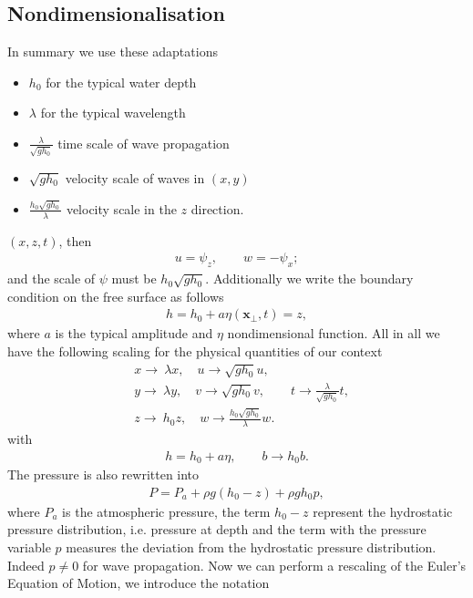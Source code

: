 \subsection{Nondimensionalisation}
In summary we use these adaptations
\begin{itemize}
    \item $h_0$ for the typical water depth
    \item $\lambda$ for the typical wavelength
    \item $\frac{\lambda}{\sqrt{g h_0}}$ time scale of wave propagation
    \item $\sqrt{g h_0}$ velocity scale of waves in $(x, y)$
    \item $\frac{h_0 \sqrt{g h_0} }{\lambda}$ velocity scale in the $z$
        direction.
\end{itemize}
$(x, z, t)$, then
\begin{align}
    u = \psi _z, \qquad w = - \psi_x;
\end{align}
and the scale of $\psi$ must be $h_0\sqrt{g h_0}$. Additionally we write the
boundary condition on the free surface as follows
\begin{align}
    h  = h_0 + a \eta (\mathbf{x}_\perp, t) = z,
\end{align}
where $a$ is the typical amplitude and $\eta$ nondimensional function. All in
all we have the following scaling for the physical quantities of our context
\begin{align}
    &x \rightarrow\ \lambda x, \quad u \rightarrow \sqrt{gh_0} u, \\
      &y \rightarrow\ \lambda y, \quad v \rightarrow \sqrt{gh_0} v, \qquad
      t\rightarrow \frac{\lambda}{\sqrt{gh_0}}t,\\
      &z \rightarrow\ h_0 z, \quad w \rightarrow
    \frac{h_0\sqrt{gh_0}}{\lambda} w.
\end{align}
with
\begin{align}
    h = h_0 + a \eta, \qquad  b \rightarrow h_0 b.
\end{align}
The pressure is also rewritten into
\begin{align}
    P = P_a + \rho g(h_0 -z) + \rho g h_0 p,
\end{align}
where $P_a$ is the atmospheric pressure, the term $h_0-z$ represent the
hydrostatic pressure distribution, i.e. pressure at depth and the term with the pressure
variable $p$  measures the deviation from the hydrostatic pressure
distribution. Indeed $p\neq 0 $ for wave propagation. Now we can perform a
rescaling of the Euler's Equation of Motion, we introduce the notation
